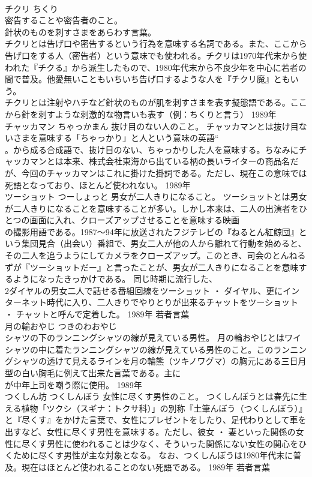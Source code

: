 \documentclass[8pt]{extreport}
\begin{document}
\begin{CJK}{UTF8}{min}
\\	チクリ	ちくり	
\\	密告することや密告者のこと。 
\\	針状のものを刺すさまをあらわす言葉。	
\\	チクリとは告げ口や密告するという行為を意味する名詞である。また、ここから告げ口をする人（密告者）という意味でも使われる。チクリは1970年代末から使われた『チクる』から派生したもので、1980年代末から不良少年を中心に若者の間で普及。他愛無いこともいちいち告げ口するような人を『チクリ魔』ともいう。 
\\	チクリとは注射やハチなど針状のものが肌を刺すさまを表す擬態語である。ここから針を刺すような刺激的な物言いも表す（例：ちくりと言う）	1989年	
\\	チャッカマン	ちゃっかまん	抜け目のない人のこと。	チャッカマンとは抜け目ないさまを意味する「ちゃっかり」と人という意味の英語“
\\	。から成る合成語で、抜け目のない、ちゃっかりした人を意味する。ちなみにチャッカマンとは本来、株式会社東海から出ている柄の長いライターの商品名だが、今回のチャッカマンはこれに掛けた掛詞である。ただし、現在この意味では死語となっており、ほとんど使われない。	1989年	
\\	ツーショット	つーしょっと	男女が二人きりになること。	ツーショットとは男女が二人きりになることを意味することが多い。しかし本来は、二人の出演者をひとつの画面に入れ、クローズアップさせることを意味する映画
\\	の撮影用語である。1987～94年に放送されたフジテレビの『ねるとん紅鯨団』という集団見合（出会い）番組で、男女二人が他の人から離れて行動を始めると、その二人を追うようにしてカメラをクローズアップ。このとき、司会のとんねるずが『ツーショットだー』と言ったことが、男女が二人きりになることを意味するようになったきっかけである。 同じ時期に流行した、
\\	2ダイヤルの男女二人で話せる番組回線をツーショット ・ ダイヤル、更にインターネット時代に入り、二人きりでやりとりが出来るチャットをツーショット ・ チャットと呼んで定着した。	1989年	若者言葉	
\\	月の輪おやじ	つきのわおやじ	
\\	シャツの下のランニングシャツの線が見えている男性。	月の輪おやじとはワイシャツの中に着たランニングシャツの線が見えている男性のこと。このランニングシャツの透けて見えるラインを月の輪熊（ツキノワグマ）の胸元にある三日月型の白い胸毛に例えて出来た言葉である。主に
\\	が中年上司を嘲う際に使用。	1989年	
\\	つくしん坊	つくしんぼう	女性に尽くす男性のこと。	つくしんぼうとは春先に生える植物「ツクシ（スギナ：トクサ科）」の別称『土筆んぼう（つくしんぼう）』と『尽くす』をかけた言葉で、女性にプレゼントをしたり、足代わりとして車を出すなど、女性に尽くす男性を意味する。ただし、彼女 ・ 妻といった関係の女性に尽くす男性に使われることは少なく、そういった関係にない女性の関心をひくために尽くす男性が主な対象となる。 なお、つくしんぼうは1980年代末に普及。現在はほとんど使われることのない死語である。	1989年	若者言葉	

\end{CJK}
\end{document}
